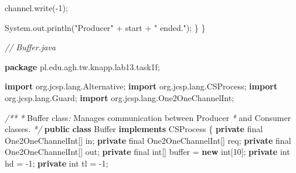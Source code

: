 \documentclass[11pt]{article}
\newenvironment{Shaded}{}{}
\newcommand{\KeywordTok}[1]{\textcolor[rgb]{0.00,0.44,0.13}{\textbf{{#1}}}}
\newcommand{\DataTypeTok}[1]{\textcolor[rgb]{0.56,0.13,0.00}{{#1}}}
\newcommand{\DecValTok}[1]{\textcolor[rgb]{0.25,0.63,0.44}{{#1}}}
\newcommand{\StringTok}[1]{\textcolor[rgb]{0.25,0.44,0.63}{{#1}}}
\newcommand{\CommentTok}[1]{\textcolor[rgb]{0.38,0.63,0.69}{\textit{{#1}}}}
\newcommand{\FunctionTok}[1]{\textcolor[rgb]{0.02,0.16,0.49}{{#1}}}
\newcommand{\NormalTok}[1]{{#1}}
\newcommand{\ImportTok}[1]{{#1}}
\newcommand{\OperatorTok}[1]{\textcolor[rgb]{0.40,0.40,0.40}{{#1}}}
\newcommand{\BuiltInTok}[1]{{#1}}
\begin{document}
\begin{Shaded}
\begin{Highlighting}[]
\NormalTok{        channel}\OperatorTok{.}\FunctionTok{write}\OperatorTok{({-}}\DecValTok{1}\OperatorTok{);}

        \BuiltInTok{System}\OperatorTok{.}\FunctionTok{out}\OperatorTok{.}\FunctionTok{println}\OperatorTok{(}\StringTok{"Producer"} \OperatorTok{+}\NormalTok{ start }\OperatorTok{+} \StringTok{" ended."}\OperatorTok{);}
    \OperatorTok{\}}
\OperatorTok{\}}
\end{Highlighting}
\end{Shaded}

    \begin{Shaded}
\begin{Highlighting}[]
\CommentTok{// Buffer.java}

\KeywordTok{package}\ImportTok{ pl}\OperatorTok{.}\ImportTok{edu}\OperatorTok{.}\ImportTok{agh}\OperatorTok{.}\ImportTok{tw}\OperatorTok{.}\ImportTok{knapp}\OperatorTok{.}\ImportTok{lab13}\OperatorTok{.}\ImportTok{task1f}\OperatorTok{;}

\KeywordTok{import} \ImportTok{org}\OperatorTok{.}\ImportTok{jcsp}\OperatorTok{.}\ImportTok{lang}\OperatorTok{.}\ImportTok{Alternative}\OperatorTok{;}
\KeywordTok{import} \ImportTok{org}\OperatorTok{.}\ImportTok{jcsp}\OperatorTok{.}\ImportTok{lang}\OperatorTok{.}\ImportTok{CSProcess}\OperatorTok{;}
\KeywordTok{import} \ImportTok{org}\OperatorTok{.}\ImportTok{jcsp}\OperatorTok{.}\ImportTok{lang}\OperatorTok{.}\ImportTok{Guard}\OperatorTok{;}
\KeywordTok{import} \ImportTok{org}\OperatorTok{.}\ImportTok{jcsp}\OperatorTok{.}\ImportTok{lang}\OperatorTok{.}\ImportTok{One2OneChannelInt}\OperatorTok{;}

\CommentTok{/**}
 \CommentTok{*}\NormalTok{ Buffer class}\CommentTok{:}\NormalTok{ Manages communication between Producer}
 \CommentTok{*}\NormalTok{ and Consumer classes}\CommentTok{.}
 \CommentTok{*/}
\KeywordTok{public} \KeywordTok{class} \BuiltInTok{Buffer} \KeywordTok{implements}\NormalTok{ CSProcess }\OperatorTok{\{}
    \KeywordTok{private} \DataTypeTok{final}\NormalTok{ One2OneChannelInt}\OperatorTok{[]}\NormalTok{ in}\OperatorTok{;}
    \KeywordTok{private} \DataTypeTok{final}\NormalTok{ One2OneChannelInt}\OperatorTok{[]}\NormalTok{ req}\OperatorTok{;}
    \KeywordTok{private} \DataTypeTok{final}\NormalTok{ One2OneChannelInt}\OperatorTok{[]}\NormalTok{ out}\OperatorTok{;}
    \KeywordTok{private} \DataTypeTok{final} \DataTypeTok{int}\OperatorTok{[]}\NormalTok{ buffer }\OperatorTok{=} \KeywordTok{new} \DataTypeTok{int}\OperatorTok{[}\DecValTok{10}\OperatorTok{];}
    \KeywordTok{private} \DataTypeTok{int}\NormalTok{ hd }\OperatorTok{=} \OperatorTok{{-}}\DecValTok{1}\OperatorTok{;}
    \KeywordTok{private} \DataTypeTok{int}\NormalTok{ tl }\OperatorTok{=} \OperatorTok{{-}}\DecValTok{1}\OperatorTok{;}


\end{Highlighting}
\end{Shaded}
\end{document}
